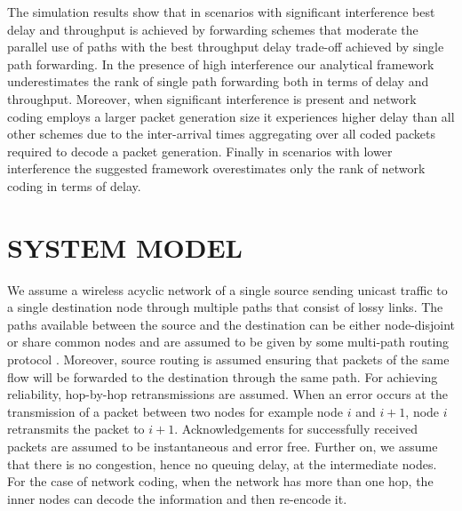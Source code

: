 \documentclass[journal, onecolumn, 12pt]{IEEEtran}
\begin{document}
The simulation results show that in scenarios with significant interference best delay and throughput is achieved by forwarding schemes that moderate the parallel use of paths with the
best throughput delay trade-off achieved by single path forwarding.
In the presence of high interference our analytical framework underestimates the rank of single path forwarding both in terms of delay and throughput.
Moreover, when significant interference is present and network coding employs a larger packet generation size it experiences higher delay than all other schemes due to the inter-arrival times
aggregating over all coded packets required to decode a packet generation.
Finally in scenarios with lower interference the suggested framework overestimates only the rank of network coding in terms of delay.


\section{\uppercase{System Model}}
\label{sec:system_model}

We assume a wireless acyclic network of a single source sending unicast traffic to a single destination node through multiple paths that consist of lossy links.
The paths available between the source and the destination can be either node-disjoint or share common nodes and are assumed to be given by some multi-path routing protocol \cite{multipath_olsr}.
Moreover, source routing is assumed ensuring that packets of the same flow will be forwarded to the destination through the same path.
For achieving reliability, hop-by-hop retransmissions are assumed.
When an error occurs at the transmission of a packet between two nodes for example node $i$ and $i + 1$, node $i$ retransmits the packet to $i + 1$.
Acknowledgements for successfully received packets are assumed to be instantaneous and error free.
Further on, we assume that there is no congestion, hence no queuing delay, at the intermediate nodes.
For the case of network coding, when the network has more than one hop, the inner nodes can decode the information and then re-encode it.
\end{document}
